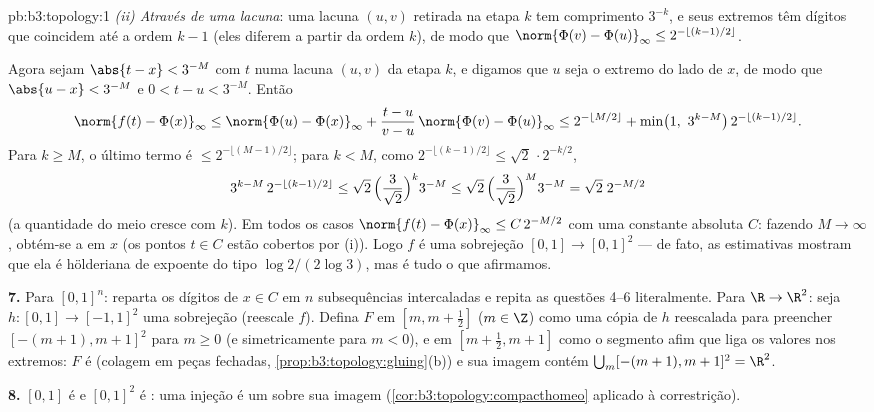 \begin{solution}{pb:b3:topology:1}
\emph{(ii) Através de uma lacuna}: uma lacuna $(u,v)$ retirada na etapa $k$
tem comprimento $3^{-k}$, e seus extremos têm dígitos que coincidem até
a ordem $k - 1$ (eles diferem a partir da ordem $k$), de modo que
$\norm{\Phi(v) - \Phi(u)}_\infty \leq
2^{-\lfloor (k-1)/2\rfloor}$.

Agora sejam $\abs{t - x} < 3^{-M}$ com $t$ numa lacuna $(u, v)$ da
etapa $k$, e digamos que $u$ seja o extremo do lado de $x$, de modo que
$\abs{u - x} < 3^{-M}$ e $0 < t - u < 3^{-M}$. Então
\[
\norm{f(t) - \Phi(x)}_\infty
\leq \norm{\Phi(u) - \Phi(x)}_\infty
+ \frac{t - u}{v - u}\,\norm{\Phi(v) - \Phi(u)}_\infty
\leq 2^{-\lfloor M/2\rfloor} + \min\bigl(1,\ 3^{k - M}\bigr)\,
2^{-\lfloor(k-1)/2\rfloor} .
\]
Para $k \geq M$, o último termo é $\leq 2^{-\lfloor(M-1)/2
\rfloor}$; para $k < M$, como $2^{-\lfloor(k-1)/2\rfloor} \leq
\sqrt2\,\cdot 2^{-k/2}$,
\[
3^{k-M}\,2^{-\lfloor(k-1)/2\rfloor}
\leq \sqrt2\,\Bigl(\frac{3}{\sqrt2}\Bigr)^{k} 3^{-M}
\leq \sqrt2\,\Bigl(\frac{3}{\sqrt2}\Bigr)^{M} 3^{-M}
= \sqrt2\; 2^{-M/2}
\]
(a quantidade do meio cresce com $k$). Em todos os casos
$\norm{f(t) - \Phi(x)}_\infty \leq C\,2^{-M/2}$
com uma constante absoluta $C$: fazendo $M \to \infty$, obtém-se a
 em $x$ (os pontos $t \in C$ estão cobertos por (i)). Logo
$f$ é uma sobrejeção  $[0,1] \to [0,1]^2$ --- de fato,
as estimativas mostram que ela é hölderiana de expoente do tipo $\log 2/(2\log
3)$, mas  é tudo o que afirmamos.

\textbf{7.} Para $[0,1]^n$: reparta os dígitos de $x \in C$ em
$n$ subsequências intercaladas e repita as questões 4--6
literalmente. Para $\R \to \R^2$: seja $h \colon [0,1] \to [-1,1]^2$
uma sobrejeção  (reescale $f$). Defina $F$ em $[m, m
+ \frac12]$ ($m \in \Z$) como uma cópia de $h$ reescalada para preencher
$[-(m+1), m+1]^2$ para $m \geq 0$ (e simetricamente para $m <
0$), e em $[m + \frac12, m + 1]$ como o segmento afim
que liga os valores nos extremos: $F$ é  (colagem em
peças fechadas, \cref{prop:b3:topology:gluing}(b)) e sua imagem
contém $\bigcup_m [-(m+1), m+1]^2 = \R^2$.

\textbf{8.} $[0,1]$ é  e $[0,1]^2$ é : uma
injeção  é um  sobre sua imagem
(\cref{cor:b3:topology:compacthomeo} aplicado à correstrição).


\end{solution}
